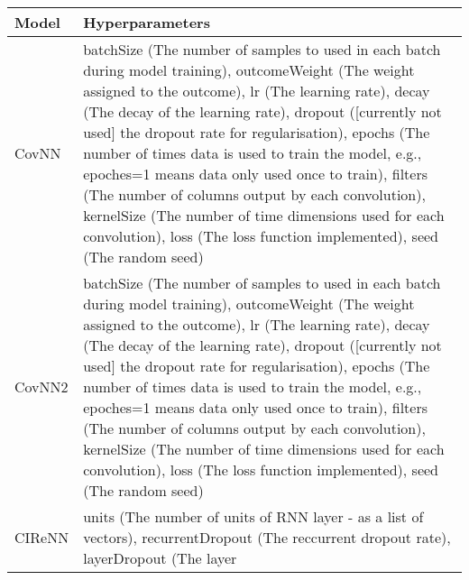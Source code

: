 \documentclass[]{article}
\begin{document}
\begin{longtable}[]{@{}ll@{}}
\toprule
\begin{minipage}[b]{0.12\columnwidth}\raggedright\strut
Model\strut
\end{minipage} & \begin{minipage}[b]{0.82\columnwidth}\raggedright\strut
Hyperparameters\strut
\end{minipage}\tabularnewline
\midrule
\endhead
\begin{minipage}[t]{0.12\columnwidth}\raggedright\strut
CovNN\strut
\end{minipage} & \begin{minipage}[t]{0.82\columnwidth}\raggedright\strut
batchSize (The number of samples to used in each batch during model
training), outcomeWeight (The weight assigned to the outcome), lr (The
learning rate), decay (The decay of the learning rate), dropout
({[}currently not used{]} the dropout rate for regularisation), epochs
(The number of times data is used to train the model, e.g., epoches=1
means data only used once to train), filters (The number of columns
output by each convolution), kernelSize (The number of time dimensions
used for each convolution), loss (The loss function implemented), seed
(The random seed)\strut
\end{minipage}\tabularnewline
\begin{minipage}[t]{0.12\columnwidth}\raggedright\strut
CovNN2\strut
\end{minipage} & \begin{minipage}[t]{0.82\columnwidth}\raggedright\strut
batchSize (The number of samples to used in each batch during model
training), outcomeWeight (The weight assigned to the outcome), lr (The
learning rate), decay (The decay of the learning rate), dropout
({[}currently not used{]} the dropout rate for regularisation), epochs
(The number of times data is used to train the model, e.g., epoches=1
means data only used once to train), filters (The number of columns
output by each convolution), kernelSize (The number of time dimensions
used for each convolution), loss (The loss function implemented), seed
(The random seed)\strut
\end{minipage}\tabularnewline
\begin{minipage}[t]{0.12\columnwidth}\raggedright\strut
CIReNN\strut
\end{minipage} & \begin{minipage}[t]{0.82\columnwidth}\raggedright\strut
units (The number of units of RNN layer - as a list of vectors),
recurrentDropout (The reccurrent dropout rate), layerDropout (The layer

\end{minipage}
\end{longtable}
\end{document}
